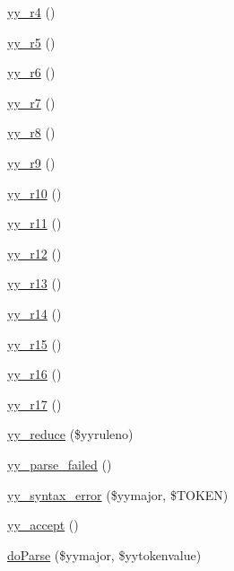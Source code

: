 \begin{DoxyCompactItemize}
\item 
\hyperlink{class_smarty___internal___configfileparser_ae785d58e4c044a40285c3d8a714da5e1}{yy\+\_\+r4} ()
\item 
\hyperlink{class_smarty___internal___configfileparser_aee7f96be365a324a093447130c58f848}{yy\+\_\+r5} ()
\item 
\hyperlink{class_smarty___internal___configfileparser_a92fbc6f127b60f579613c0bb9dac0711}{yy\+\_\+r6} ()
\item 
\hyperlink{class_smarty___internal___configfileparser_ac2fd684290780345c26f7b5f151f1e78}{yy\+\_\+r7} ()
\item 
\hyperlink{class_smarty___internal___configfileparser_ad8c850d316652e3b948ab1eab458ee6d}{yy\+\_\+r8} ()
\item 
\hyperlink{class_smarty___internal___configfileparser_aa275dce8703769684221b419b2b53688}{yy\+\_\+r9} ()
\item 
\hyperlink{class_smarty___internal___configfileparser_aef5787a24678f1642274633c598bf425}{yy\+\_\+r10} ()
\item 
\hyperlink{class_smarty___internal___configfileparser_acf1bda29ad2bcb11e32604e860e11237}{yy\+\_\+r11} ()
\item 
\hyperlink{class_smarty___internal___configfileparser_a77891bfe263e92792de2dcb0f4312806}{yy\+\_\+r12} ()
\item 
\hyperlink{class_smarty___internal___configfileparser_a98c27368521e0082afaaa21529d2546a}{yy\+\_\+r13} ()
\item 
\hyperlink{class_smarty___internal___configfileparser_aeac37a173cab2510b4e7be07cf0f0c52}{yy\+\_\+r14} ()
\item 
\hyperlink{class_smarty___internal___configfileparser_a247f87939fe62464b9492bae7e3bbeb3}{yy\+\_\+r15} ()
\item 
\hyperlink{class_smarty___internal___configfileparser_a97da2f892990b98347de822405830cae}{yy\+\_\+r16} ()
\item 
\hyperlink{class_smarty___internal___configfileparser_afdfd77ebdae8bdd6041346be78b795ee}{yy\+\_\+r17} ()
\item 
\hyperlink{class_smarty___internal___configfileparser_a9b9074bf8eda812ae40e81d76b09f24e}{yy\+\_\+reduce} (\$yyruleno)
\item 
\hyperlink{class_smarty___internal___configfileparser_a0ba6c1f3560f50c608cac17178214249}{yy\+\_\+parse\+\_\+failed} ()
\item 
\hyperlink{class_smarty___internal___configfileparser_aed886d19185ecb1ecae63806ab082da2}{yy\+\_\+syntax\+\_\+error} (\$yymajor, \$T\+O\+K\+E\+N)
\item 
\hyperlink{class_smarty___internal___configfileparser_a0fae14dd92f463ead96eac62d238f25e}{yy\+\_\+accept} ()
\item 
\hyperlink{class_smarty___internal___configfileparser_af8c096191b13b43b8aa17e6e9dc55bf9}{do\+Parse} (\$yymajor, \$yytokenvalue)
\end{DoxyCompactItemize}
